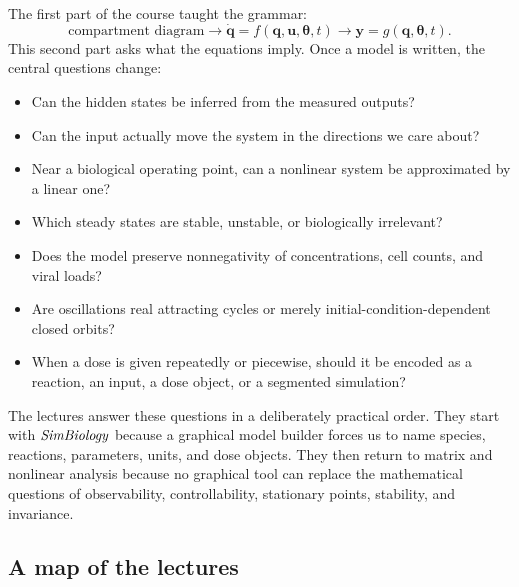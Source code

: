 \documentclass[a4paper]{article}
\newcommand{\vect}[1]{\boldsymbol{#1}}
\newcommand{\SimBio}{\ensuremath{\pksym{SimBiology}}}
\begin{document}
The first part of the course taught the grammar:
\[
  \text{compartment diagram}\longrightarrow
  \dot{\vect q}=f(\vect q,\vect u,\vect\theta,t)\longrightarrow
  \vect y=g(\vect q,\vect\theta,t).
\]
This second part asks what the equations imply. Once a model is written, the central questions change:
\begin{itemize}[leftmargin=2em]
  \item Can the hidden states be inferred from the measured outputs?
  \item Can the input actually move the system in the directions we care about?
  \item Near a biological operating point, can a nonlinear system be approximated by a linear one?
  \item Which steady states are stable, unstable, or biologically irrelevant?
  \item Does the model preserve nonnegativity of concentrations, cell counts, and viral loads?
  \item Are oscillations real attracting cycles or merely initial-condition-dependent closed orbits?
  \item When a dose is given repeatedly or piecewise, should it be encoded as a reaction, an input, a dose object, or a segmented simulation?
\end{itemize}

The lectures answer these questions in a deliberately practical order. They start with \SimBio{} because a graphical model builder forces us to name species, reactions, parameters, units, and dose objects. They then return to matrix and nonlinear analysis because no graphical tool can replace the mathematical questions of observability, controllability, stationary points, stability, and invariance.

\subsection{A map of the lectures}
\end{document}
